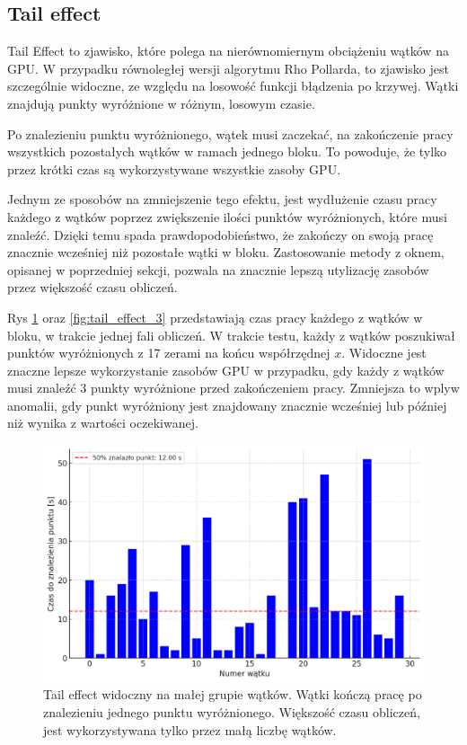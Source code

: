 \subsection{Tail effect}
Tail Effect to zjawisko, które polega na nierównomiernym obciążeniu wątków na GPU.
W przypadku równoległej wersji algorytmu Rho Pollarda, to zjawisko jest szczególnie widoczne,
ze względu na losowość funkcji błądzenia po krzywej.
Wątki znajdują punkty wyróżnione w różnym, losowym czasie.
\par
Po znalezieniu punktu wyróżnionego, wątek musi zaczekać, na zakończenie pracy wszystkich
pozostałych wątków w ramach jednego bloku.
To powoduje, że tylko przez krótki czas są wykorzystywane wszystkie zasoby GPU.
\par
Jednym ze sposobów na zmniejszenie tego efektu, jest wydłużenie czasu pracy każdego z wątków poprzez zwiększenie ilości punktów wyróżnionych,
które musi znaleźć. Dzięki temu spada prawdopodobieństwo, że zakończy on swoją pracę znacznie wcześniej niż pozostałe wątki w bloku.
Zastosowanie metody z oknem, opisanej w poprzedniej sekcji, pozwala na znacznie lepszą utylizację zasobów przez większość
czasu obliczeń.
\par
Rys \ref{fig:tail_effect_1} oraz \ref{fig:tail_effect_3} przedstawiają czas pracy każdego z wątków w bloku, w trakcie jednej fali obliczeń.
W trakcie testu, każdy z wątków poszukiwał punktów wyróżnionych z 17 zerami na końcu współrzędnej $x$. Widoczne jest
znaczne lepsze wykorzystanie zasobów GPU w przypadku, gdy każdy z wątków musi znaleźć 3 punkty wyróżnione przed zakończeniem pracy.
Zmniejsza to wplyw anomalii, gdy punkt wyróżniony jest znajdowany znacznie wcześniej lub później niż wynika z wartości oczekiwanej.

\begin{figure}[H]
    \centering
    \includegraphics[width=1\textwidth]{img/tailing_effect_single_17.png}
    \caption{Tail effect widoczny na małej grupie wątków. Wątki kończą pracę po znalezieniu jednego punktu wyróżnionego.
        Większość czasu obliczeń, jest wykorzystywana tylko przez małą liczbę wątków.}
    \label{fig:tail_effect_1}
\end{figure}

